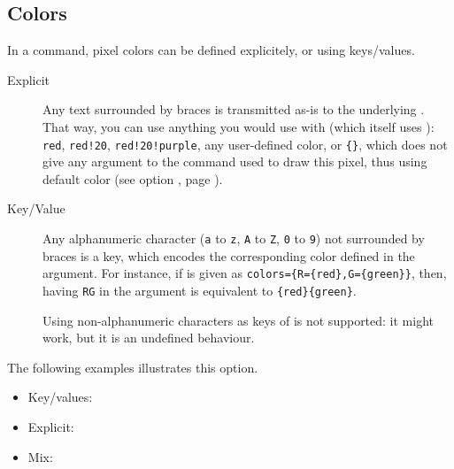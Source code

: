 \documentclass[
  load-preamble-,
  babel-options=english,
  add-index=true,
]{cnltx-doc}
\begin{document}
\subsection{Colors}
\label{sec:colors}

In a  command, pixel colors can be defined explicitely, or using keys/values.

\begin{description}
  \item[Explicit] Any text surrounded by braces is transmitted as-is to the underlying . That way, you can use anything you would use with  (which itself uses ): \texttt{red}, \texttt{red!20}, \texttt{red!20!purple}, any user-defined color, or \texttt{\{\}}, which does not give any  argument to the  command used to draw this pixel, thus using default  color (see option , page \pageref{option:tikz}).
  \item[Key/Value] Any alphanumeric character (\texttt{a} to \texttt{z}, \texttt{A} to \texttt{Z}, \texttt{0} to \texttt{9}) not surrounded by braces is a key, which encodes the corresponding color defined in the  argument. For instance, if  is given as \texttt{colors=\{R=\{red\},G=\{green\}\}}, then, having \texttt{RG} in the  argument is equivalent to \texttt{\{red\}\{green\}}.

    Using non-alphanumeric characters as keys of  is not supported: it might work, but it is an undefined behaviour.
  \end{description}

  The following examples illustrates this option.

  \begin{itemize}
    \item Key/values:
      \begin{sidebyside}
      \end{sidebyside}
    \item Explicit:
      \begin{sidebyside}
      \end{sidebyside}
    \item Mix:
      \begin{sidebyside}
      \end{sidebyside}
  \end{itemize}
\end{document}
